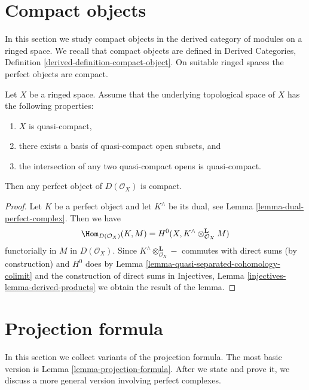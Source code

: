 \section{Compact objects}
\label{section-compact}

\noindent
In this section we study compact objects in the derived category of modules
on a ringed space. We recall that compact objects are defined in
Derived Categories, Definition \ref{derived-definition-compact-object}.
On suitable ringed spaces the perfect objects are compact.

\begin{lemma}
\label{lemma-perfect-is-compact}
Let $X$ be a ringed space. Assume that the underlying topological space
of $X$ has the following properties:
\begin{enumerate}
\item $X$ is quasi-compact,
\item there exists a basis of quasi-compact open subsets, and
\item the intersection of any two quasi-compact opens is quasi-compact.
\end{enumerate}
Then any perfect object of $D(\mathcal{O}_X)$ is compact.
\end{lemma}

\begin{proof}
Let $K$ be a perfect object and let $K^\wedge$ be its dual, see
Lemma \ref{lemma-dual-perfect-complex}. Then we have
$$
\Hom_{D(\mathcal{O}_X)}(K, M) =
H^0(X, K^\wedge \otimes_{\mathcal{O}_X}^\mathbf{L} M)
$$
functorially in $M$ in $D(\mathcal{O}_X)$. Since
$K^\wedge \otimes_{\mathcal{O}_X}^\mathbf{L} -$ commutes with
direct sums (by construction) and $H^0$ does by
Lemma \ref{lemma-quasi-separated-cohomology-colimit}
and the construction of direct sums in
Injectives, Lemma \ref{injectives-lemma-derived-products}
we obtain the result of the lemma.
\end{proof}











\section{Projection formula}
\label{section-projection-formula}

\noindent
In this section we collect variants of the projection formula.
The most basic version is Lemma \ref{lemma-projection-formula}.
After we state and prove it, we discuss a more general version
involving perfect complexes.

